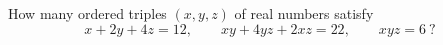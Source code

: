 How many ordered triples $(x,y,z)$ of real numbers satisfy
\[
x+2y+4z=12,\qquad xy+4yz+2xz=22,\qquad xyz=6\ ?
\]
